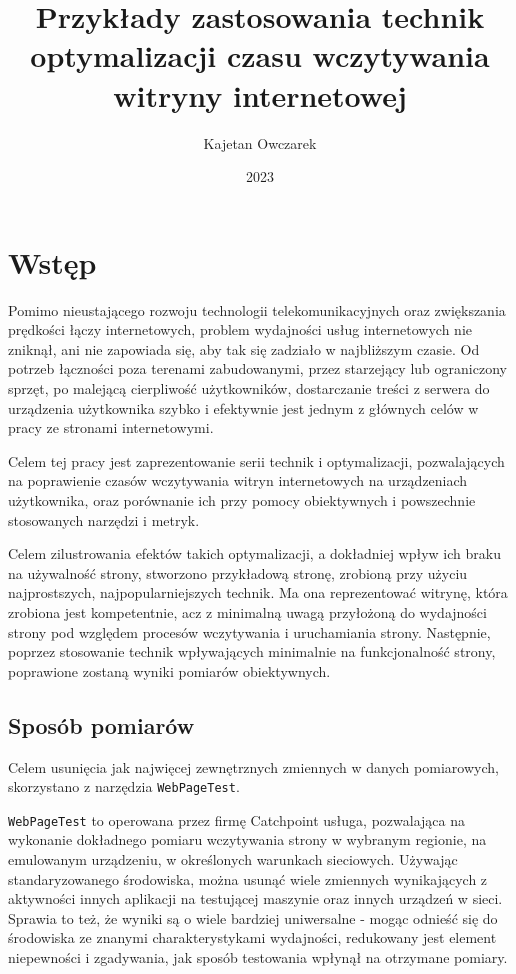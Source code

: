 \documentclass[licencjacka]{pracadypl}
\author{Kajetan Owczarek}
\title{Przykłady zastosowania technik optymalizacji czasu wczytywania witryny internetowej}
\date{2023}
\begin{document}
\maketitle
\tableofcontents
\newpage



\chapter{Wstęp}

Pomimo nieustającego rozwoju technologii telekomunikacyjnych oraz zwiększania prędkości łączy internetowych, problem wydajności usług internetowych nie zniknął, ani nie zapowiada się, aby tak się zadziało w najbliższym czasie. Od potrzeb łączności poza terenami zabudowanymi, przez starzejący lub ograniczony sprzęt, po malejącą cierpliwość użytkowników, dostarczanie treści z serwera do urządzenia użytkownika szybko i efektywnie jest jednym z głównych celów w pracy ze stronami internetowymi.

Celem tej pracy jest zaprezentowanie serii technik i optymalizacji, pozwalających na poprawienie czasów wczytywania witryn internetowych na urządzeniach użytkownika, oraz porównanie ich przy pomocy obiektywnych i powszechnie stosowanych narzędzi i metryk.

Celem zilustrowania efektów takich optymalizacji, a dokładniej wpływ ich braku na używalność strony, stworzono przykładową stronę, zrobioną przy użyciu najprostszych, najpopularniejszych technik. Ma ona reprezentować witrynę, która zrobiona jest kompetentnie, acz z minimalną uwagą przyłożoną do wydajności strony pod względem procesów wczytywania i uruchamiania strony. Następnie, poprzez stosowanie technik wpływających minimalnie na funkcjonalność strony, poprawione zostaną wyniki pomiarów obiektywnych.

\section{Sposób pomiarów}
Celem usunięcia jak najwięcej zewnętrznych zmiennych w danych pomiarowych,
skorzystano z narzędzia \texttt{WebPageTest}.

\texttt{WebPageTest} to operowana przez firmę Catchpoint usługa, pozwalająca na wykonanie dokładnego pomiaru wczytywania strony w wybranym regionie, na emulowanym urządzeniu, w określonych warunkach sieciowych. Używając standaryzowanego środowiska, można usunąć wiele zmiennych wynikających z aktywności innych aplikacji na testującej maszynie oraz innych urządzeń w sieci. Sprawia to też, że wyniki są o wiele bardziej uniwersalne - mogąc odnieść się do środowiska ze znanymi charakterystykami wydajności, redukowany jest element niepewności i zgadywania, jak sposób testowania wpłynął na otrzymane pomiary. 
\end{document}
